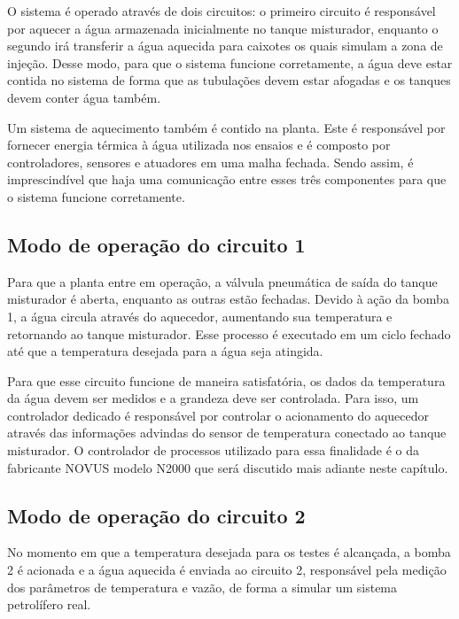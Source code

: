 O sistema é operado através de dois circuitos: o primeiro circuito é responsável por aquecer a água armazenada inicialmente no tanque misturador, enquanto o segundo irá transferir a água aquecida para caixotes os quais simulam a zona de injeção. Desse modo, para que o sistema funcione corretamente, a água deve estar contida no sistema de forma que as tubulações devem estar afogadas e os tanques devem conter água também.

Um sistema de aquecimento também é contido na planta. Este é responsável por fornecer energia térmica à água utilizada nos ensaios e é composto por controladores, sensores e atuadores em uma malha fechada. Sendo assim, é imprescindível que haja uma comunicação entre esses três componentes para que o sistema funcione corretamente.

\subsection{Modo de operação do circuito 1}

Para que a planta entre em operação, a válvula pneumática de saída do tanque misturador é aberta, enquanto as outras estão fechadas. Devido à ação da bomba 1, a água circula através do aquecedor, aumentando sua temperatura e retornando ao tanque misturador. Esse processo é executado em um ciclo fechado até que a temperatura desejada para a água seja atingida. 

Para que esse circuito funcione de maneira satisfatória, os dados da temperatura da água devem ser medidos e a grandeza deve ser controlada. Para isso, um controlador dedicado é responsável por controlar o acionamento do aquecedor através das informações advindas do sensor de temperatura conectado ao tanque misturador. O controlador de processos utilizado para essa finalidade é o da fabricante NOVUS modelo N2000 que será discutido mais adiante neste capítulo.

\subsection{Modo de operação do circuito 2}

No momento em que a temperatura desejada para os testes é alcançada, a bomba 2 é acionada e a água aquecida é enviada ao circuito 2, responsável pela medição dos parâmetros de temperatura e vazão, de forma a simular um sistema petrolífero real. 


